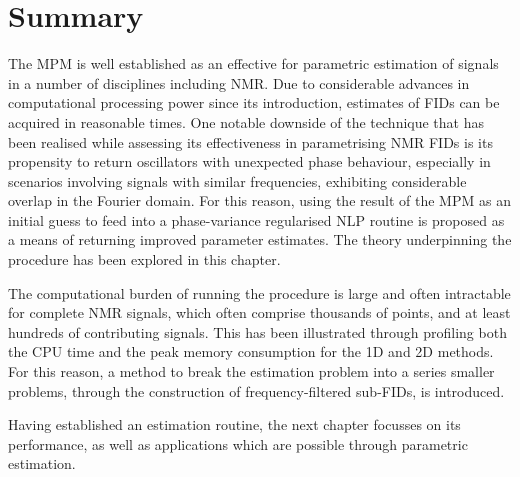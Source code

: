 \section{Summary}
The \ac{MPM} is well established as an effective for parametric estimation of
signals in a number of disciplines including \ac{NMR}.
Due to considerable advances in computational processing power since
its introduction, estimates of \acp{FID} can be acquired in reasonable times.
One notable downside of the technique that has been realised while assessing
its effectiveness in parametrising \ac{NMR} \acp{FID} is its propensity to
return oscillators with unexpected phase behaviour, especially in scenarios
involving signals with similar frequencies, exhibiting considerable overlap in
the Fourier domain.
For this reason, using the result of the \ac{MPM} as an initial guess to feed
into a phase-variance regularised \ac{NLP} routine is proposed as a means of
returning improved parameter estimates. The theory underpinning the procedure
has been explored in this chapter.

The computational burden of running the procedure is large and often
intractable for complete \ac{NMR} signals, which often comprise thousands of
points, and at least hundreds of contributing signals. This has been
illustrated through profiling both the \ac{CPU} time and the peak memory
consumption for the \ac{1D} and \ac{2D} methods.  For this reason, a method to break the estimation problem into a
series smaller problems, through the construction of frequency-filtered
sub-\acp{FID}, is introduced.

Having established an estimation routine, the next chapter focusses on its
performance, as well as applications which are possible through parametric
estimation.


